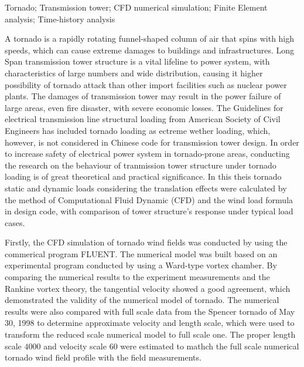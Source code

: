 \begin{englishabstract}{Tornado; Transmission tower; CFD numerical simulation; Finite Element analysis; Time-history analysis }

  A tornado is a rapidly rotating funnel-shaped column of air that spins with high speeds, which can cause extreme damages to buildings and infrastructures.
  Long Span transmission tower structure is a vital lifeline to power system, with characteristics of large numbers and wide distribution, causing it higher possibility of tornado attack than other import facilities such as nuclear power plants.
  The damages of transmission tower may result in the power failure of large areas, even fire disaster, with severe economic losses.
  The Guidelines for electrical transmission line structural loading from American Society of Civil Engineers has included tornado loading as ectreme wether loading, which, however, is not considered in Chinese code for transmission tower design.
  In order to increase safety of electrical power system in tornado-prone areas, conducting the research on the behaviour of tranmission tower structure under tornado loading is of great theoretical and practical significance.
  In this theis tornado static and dynamic loads considering the translation effects were calculated by the method of Computational Fluid Dynamic (CFD) and the wind load formula in design code, with comparison of tower structure's response under typical load cases.

  Firstly, the CFD simulation of tornado wind fields was conducted by using the commerical program FLUENT.
  The numerical model was built based on an experimental program conducted by using a Ward-type vortex chamber.
  By comparing the numerical results to the experiment measurements and the Rankine vortex theory, the tangential velocity showed a good agreement, which demonstrated the validity of the numerical model of tornado.
  The numerical results were also compared with full scale data from the Spencer tornado of May 30, 1998 to determine approximate velocity and length scale, which were used to transform the reduced scale numerical model to full scale one.
  The proper length scale $4000$ and velocity scale $60$ were estimated to mathch the full scale numerical tornado wind field profile with the field measurements.


\end{englishabstract}
